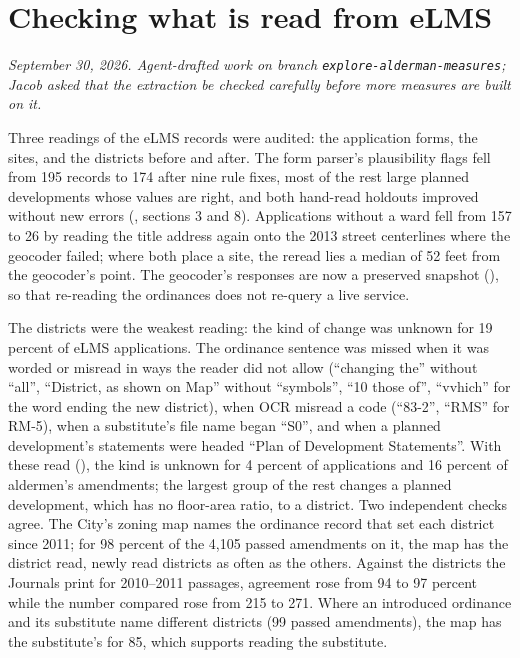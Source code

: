 \clearpage
\section*{Checking what is read from eLMS}
\textit{September 30, 2026. Agent-drafted work on branch \texttt{explore-alderman-measures}; Jacob asked that the
extraction be checked carefully before more measures are built on it.}

Three readings of the eLMS records were audited: the application forms, the sites, and the districts before and after.
The form parser's plausibility flags fell from 195 records to 174 after nine rule fixes, most of the rest large
planned developments whose values are right, and both hand-read holdouts improved without new errors
(, sections 3 and 8). Applications without a ward fell from 157 to 26 by
reading the title address again onto the 2013 street centerlines where the geocoder failed; where both place a site,
the reread lies a median of 52 feet from the geocoder's point. The geocoder's responses are now a preserved snapshot
(), so that re-reading the ordinances does not re-query a live service.

The districts were the weakest reading: the kind of change was unknown for 19 percent of eLMS applications. The
ordinance sentence was missed when it was worded or misread in ways the reader did not allow (``changing the'' without
``all'', ``District, as shown on Map'' without ``symbols'', ``10 those of'', ``vvhich'' for the word ending the new
district), when OCR misread a code (``83-2'', ``RMS'' for RM-5), when a substitute's file name began ``S0'', and when
a planned development's statements were headed ``Plan of Development Statements''. With these read
(), the kind is unknown for 4 percent of applications and 16 percent of
aldermen's amendments; the largest group of the rest changes a planned development, which has no floor-area ratio, to
a district. Two independent checks agree. The City's zoning map names the ordinance record that set each district
since 2011; for 98 percent of the 4,105 passed amendments on it, the map has the district read, newly read districts
as often as the others. Against the districts the Journals print for 2010--2011 passages, agreement rose from 94 to 97
percent while the number compared rose from 215 to 271. Where an introduced ordinance and its substitute name
different districts (99 passed amendments), the map has the substitute's for 85, which supports reading the
substitute.

